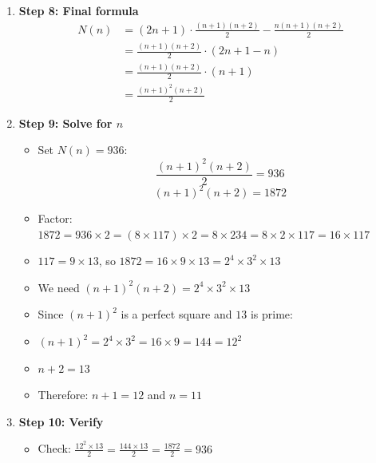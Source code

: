 \documentclass[12pt]{article}
\begin{document}
\begin{techniquesbox}
\begin{itemize}[leftmargin=*]
\begin{enumerate}
        \item \textbf{Step 8: Final formula}
        \begin{align*}
        N(n) &= (2n+1) \cdot \frac{(n+1)(n+2)}{2} - \frac{n(n+1)(n+2)}{2}\\
        &= \frac{(n+1)(n+2)}{2} \cdot (2n+1-n)\\
        &= \frac{(n+1)(n+2)}{2} \cdot (n+1)\\
        &= \frac{(n+1)^2(n+2)}{2}
        \end{align*}
        
        \item \textbf{Step 9: Solve for $n$}
        \begin{itemize}
            \item Set $N(n) = 936$:
            \[\frac{(n+1)^2(n+2)}{2} = 936\]
            \[(n+1)^2(n+2) = 1872\]
            \item Factor: $1872 = 936 \times 2 = (8 \times 117) \times 2 = 8 \times 234 = 8 \times 2 \times 117 = 16 \times 117$
            \item $117 = 9 \times 13$, so $1872 = 16 \times 9 \times 13 = 2^4 \times 3^2 \times 13$
            \item We need $(n+1)^2(n+2) = 2^4 \times 3^2 \times 13$
            \item Since $(n+1)^2$ is a perfect square and $13$ is prime:
            \item $(n+1)^2 = 2^4 \times 3^2 = 16 \times 9 = 144 = 12^2$
            \item $n+2 = 13$
            \item Therefore: $n+1 = 12$ and $n = 11$
        \end{itemize}
        
        \item \textbf{Step 10: Verify}
        \begin{itemize}
            \item Check: $\frac{12^2 \times 13}{2} = \frac{144 \times 13}{2} = \frac{1872}{2} = 936$ \checkmark
        \end{itemize}
    \end{enumerate}
\end{itemize}


\end{techniquesbox}
\end{document}
